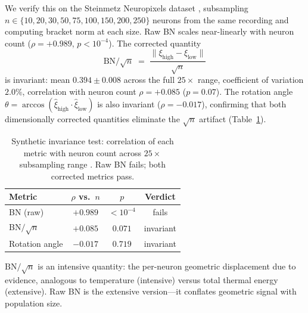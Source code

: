 \documentclass{article}
\begin{document}
We verify this on the Steinmetz Neuropixels dataset \citep{dandi000028}, subsampling $n \in \{10, 20, 30, 50, 75, 100, 150, 200, 250\}$ neurons from the same recording and computing bracket norm at each size. Raw BN scales near-linearly with neuron count ($\rho = +0.989$, $p < 10^{-4}$). The corrected quantity
\begin{equation}
\text{BN}/\!\sqrt{n} \;=\; \frac{\bigl\lVert \xi_{\text{high}} - \xi_{\text{low}} \bigr\rVert}{\sqrt{n}}
\end{equation}
is invariant: mean $0.394 \pm 0.008$ across the full $25\times$ range, coefficient of variation $2.0\%$, correlation with neuron count $\rho = +0.085$ ($p = 0.07$). The rotation angle $\theta = \arccos(\hat{\xi}_{\text{high}} \cdot \hat{\xi}_{\text{low}})$ is also invariant ($\rho = -0.017$), confirming that both dimensionally corrected quantities eliminate the $\sqrt{n}$ artifact (Table~\ref{tab:invariance}).

\begin{table}[t]
\centering
\caption{Synthetic invariance test: correlation of each metric with neuron count across $25\times$ subsampling range \citep{dandi000028}. Raw BN fails; both corrected metrics pass.}
\label{tab:invariance}
\small
\begin{tabular}{lccc}
\toprule
Metric & $\rho$ vs.\ $n$ & $p$ & Verdict \\
\midrule
BN (raw) & $+0.989$ & $<10^{-4}$ & fails \\
BN$/\!\sqrt{n}$ & $+0.085$ & $0.071$ & invariant \\
Rotation angle & $-0.017$ & $0.719$ & invariant \\
\bottomrule
\end{tabular}
\end{table}

$\text{BN}/\!\sqrt{n}$ is an intensive quantity: the per-neuron geometric displacement due to evidence, analogous to temperature (intensive) versus total thermal energy (extensive). Raw BN is the extensive version---it conflates geometric signal with population size.
\end{document}
